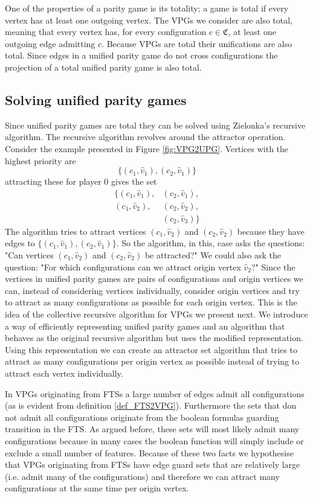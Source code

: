 One of the properties of a parity game is its totality; a game is total if every vertex has at least one outgoing vertex. The VPGs we consider are also total, meaning that every vertex has, for every configuration $c \in \mathfrak{C}$, at least one outgoing edge admitting $c$. Because VPGs are total their unifications are also total. Since edges in a unified parity game do not cross configurations the projection of a total unified parity game is also total.

\subsection{Solving unified parity games}
Since unified parity games are total they can be solved using Zielonka's recursive algorithm. The recursive algorithm revolves around the attractor operation. Consider the example presented in Figure \ref{fig:VPG2UPG}. Vertices with the highest priority are 
\[ \{(c_1,\hat{v}_1),(c_2,\hat{v}_1)\}\]
attracting these for player $0$ gives the set 
\begin{align*}
\{(c_1,\hat{v}_1),&(c_2,\hat{v}_1),\\
(c_1,\hat{v}_2),&(c_2,\hat{v}_2),\\
 &(c_2,\hat{v}_3)\}
\end{align*}
The algorithm tries to attract vertices $(c_1,\hat{v}_2)$ and $(c_2,\hat{v}_2)$ because they have edges to $\{(c_1,\hat{v}_1), (c_2,\hat{v}_1)\}$. So the algorithm, in this, case asks the questions: "Can vertices $(c_1,\hat{v}_2)$ and $(c_2,\hat{v}_2)$ be attracted?" We could also ask the question: "For which configurations can we attract origin vertex $\hat{v}_2$?" Since the vertices in unified parity games are pairs of configurations and origin vertices we can, instead of considering vertices individually, consider origin vertices and try to attract as many configurations as possible for each origin vertex. This is the idea of the collective recursive algorithm for VPGs we present next. We introduce a way of efficiently representing unified parity games and an algorithm that behaves as the original recursive algorithm but uses the modified representation. Using this representation we can create an attractor set algorithm that tries to attract as many configurations per origin vertex as possible instead of trying to attract each vertex individually.

In VPGs originating from FTSs a large number of edges admit all configurations (as is evident from definition \ref{def_FTS2VPG}). Furthermore the sets that don not admit all configurations originate from the boolean formulas guarding transition in the FTS. As argued before, these sets will most likely admit many configurations because in many cases the boolean function will simply include or exclude a small number of features. Because of these two facts we hypothesise that VPGs originating from FTSs have edge guard sets that are relatively large (i.e. admit many of the configurations) and therefore we can attract many configurations at the same time per origin vertex.

